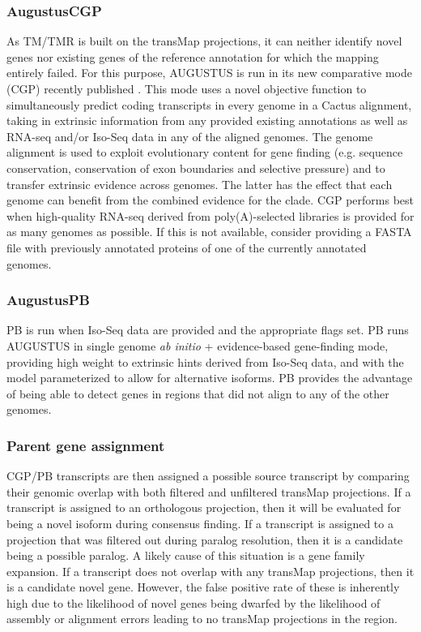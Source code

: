 \documentclass[fleqn,10pt]{wlscirep}
\begin{document}
\subsubsection*{AugustusCGP}
	As TM/TMR is built on the transMap projections, it can neither identify novel genes nor existing genes of the reference annotation for which the mapping entirely failed. For this purpose, AUGUSTUS is run in its new comparative mode (CGP) recently published \cite{konig2015simultaneous}. This mode uses a novel objective function to simultaneously predict coding transcripts in every genome in a Cactus alignment, taking in extrinsic information from any provided existing annotations as well as RNA-seq and/or Iso-Seq data in any of the aligned genomes. The genome alignment is used to exploit evolutionary content for gene finding (e.g. sequence conservation, conservation of exon boundaries and selective pressure) and to transfer extrinsic evidence across genomes. The latter has the effect that each genome can benefit from the combined evidence for the clade. CGP performs best when high-quality RNA-seq derived from poly(A)-selected libraries is provided for as many genomes as possible. If this is not available, consider providing a FASTA file with previously annotated proteins of one of the currently annotated genomes. 
  
\subsubsection*{AugustusPB}
	PB is run when Iso-Seq data are provided and the appropriate flags set. PB runs AUGUSTUS in single genome \textit{ab initio} + evidence-based gene-finding mode, providing high weight to extrinsic hints derived from Iso-Seq data, and with the model parameterized to allow for alternative isoforms. PB provides the advantage of being able to detect genes in regions that did not align to any of the other genomes.
  
\subsubsection*{Parent gene assignment}
CGP/PB transcripts are then assigned a possible source transcript by comparing their genomic overlap with both filtered and unfiltered transMap projections. If a transcript is assigned to an orthologous projection, then it will be evaluated for being a novel isoform during consensus finding. If a transcript is assigned to a projection that was filtered out during paralog resolution, then it is a candidate being a possible paralog. A likely cause of this situation is a gene family expansion. If a transcript does not overlap with any transMap projections, then it is a candidate novel gene. However, the false positive rate of these is inherently high due to the likelihood of novel genes being dwarfed by the likelihood of assembly or alignment errors leading to no transMap projections in the region.
\end{document}
